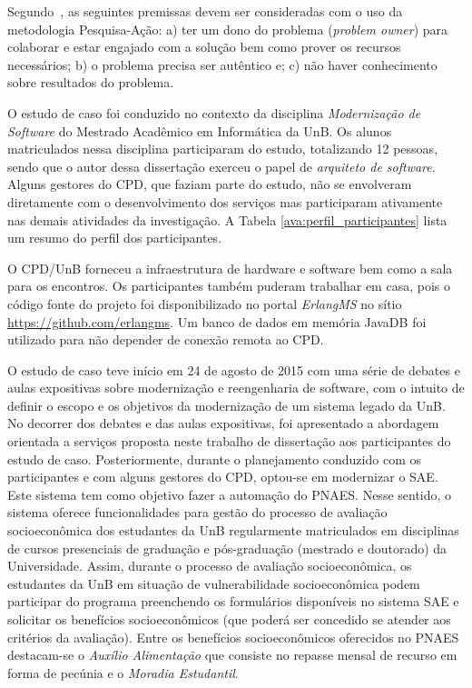 Segundo~\cite{santos2009action}, as seguintes premissas devem
ser consideradas com o uso da metodologia Pesquisa-Ação: a) ter um
dono do problema (\textit{problem owner}) para
colaborar e estar engajado com a solução bem como prover os recursos
necessários; b) o problema precisa ser autêntico e; c) não haver
conhecimento sobre resultados do problema.

O estudo de caso foi conduzido no contexto da disciplina 
\emph{Modernização de Software} do Mestrado Acadêmico em Informática 
da \acrshort{UnB}. Os alunos matriculados nessa disciplina participaram
do estudo, totalizando 12 pessoas, sendo que o autor dessa dissertação
exerceu o papel de \emph{arquiteto de software}. Alguns gestores do CPD, que
faziam parte do estudo, não se envolveram diretamente com o desenvolvimento
dos serviços mas participaram ativamente nas demais atividades da investigação.
A Tabela \ref{ava:perfil_participantes} lista um resumo do perfil dos participantes.



O CPD/UnB forneceu a infraestrutura de hardware e software bem
como a sala para os encontros. Os participantes também puderam
trabalhar em casa, pois o código fonte do projeto foi 
disponibilizado no portal \emph{ErlangMS} no 
sítio \url{https://github.com/erlangms}. Um
banco de dados em memória JavaDB foi utilizado para
não depender de conexão remota ao CPD.

O estudo de caso teve início em 24 de agosto de 2015
com uma série de debates e aulas expositivas sobre
modernização e reengenharia de software, 
com o intuito de definir o escopo e os objetivos da 
modernização de um sistema legado da \acrshort{UnB}. 
No decorrer dos
debates e das aulas expositivas, foi apresentado a abordagem
orientada a serviços proposta neste trabalho de dissertação 
aos participantes do 
estudo de caso. Posteriormente, durante o planejamento 
conduzido com os participantes e com alguns gestores
do CPD, optou-se em modernizar o \acrfull{SAE}. Este sistema
tem como objetivo fazer a automação
do \acrfull{PNAES}. Nesse sentido, o sistema oferece
funcionalidades para gestão do processo de 
avaliação socioeconômica dos estudantes da \acrshort{UnB} 
regularmente matriculados em disciplinas de cursos
presenciais de graduação e pós-graduação (mestrado e doutorado)
da Universidade. Assim, durante o processo de avaliação socioeconômica, 
os estudantes da \acrshort{UnB} em situação de
vulnerabilidade socioeconômica podem participar do programa 
preenchendo os formulários 
disponíveis no sistema \acrshort{SAE} e solicitar os benefícios
socioeconômicos (que poderá ser concedido se atender aos critérios da avaliação). 
Entre os benefícios socioeconômicos oferecidos no \acrshort{PNAES} 
destacam-se o \emph{Auxílio Alimentação} que 
consiste no repasse mensal de recurso em forma
de pecúnia e o \emph{Moradia Estudantil}.

